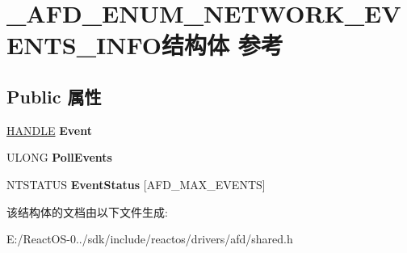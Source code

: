 \hypertarget{struct___a_f_d___e_n_u_m___n_e_t_w_o_r_k___e_v_e_n_t_s___i_n_f_o}{}\section{\+\_\+\+A\+F\+D\+\_\+\+E\+N\+U\+M\+\_\+\+N\+E\+T\+W\+O\+R\+K\+\_\+\+E\+V\+E\+N\+T\+S\+\_\+\+I\+N\+F\+O结构体 参考}
\label{struct___a_f_d___e_n_u_m___n_e_t_w_o_r_k___e_v_e_n_t_s___i_n_f_o}
\subsection*{Public 属性}
\begin{DoxyCompactItemize}
\item 
\mbox{\label{struct___a_f_d___e_n_u_m___n_e_t_w_o_r_k___e_v_e_n_t_s___i_n_f_o_a4082c5ae4238a0c9e90a140bdf83364e}} 
\hyperlink{interfacevoid}{H\+A\+N\+D\+LE} {\bfseries Event}
\item 
\mbox{\label{struct___a_f_d___e_n_u_m___n_e_t_w_o_r_k___e_v_e_n_t_s___i_n_f_o_a7cf329fa1a3002254ea39715917cd0fa}} 
U\+L\+O\+NG {\bfseries Poll\+Events}
\item 
\mbox{\label{struct___a_f_d___e_n_u_m___n_e_t_w_o_r_k___e_v_e_n_t_s___i_n_f_o_a659a11a741ef84aae381f66dee756949}} 
N\+T\+S\+T\+A\+T\+US {\bfseries Event\+Status} \mbox{[}A\+F\+D\+\_\+\+M\+A\+X\+\_\+\+E\+V\+E\+N\+TS\mbox{]}
\end{DoxyCompactItemize}


该结构体的文档由以下文件生成\+:\begin{DoxyCompactItemize}
\item 
E\+:/\+React\+O\+S-\/0../sdk/include/reactos/drivers/afd/shared.\+h\end{DoxyCompactItemize}
